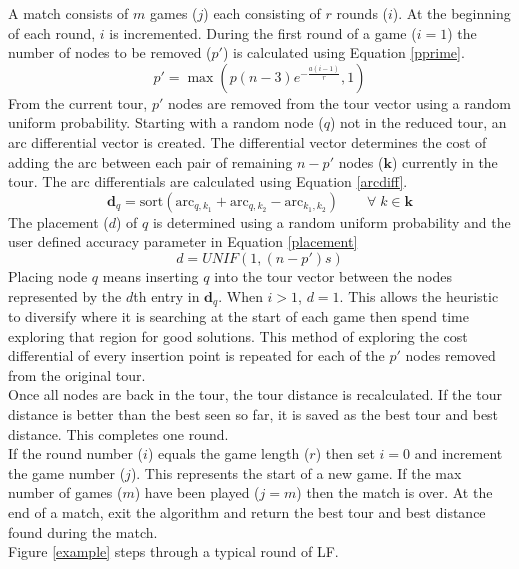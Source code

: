 \documentclass[12pt,letterpaper,oneside]{book}
\begin{document}
	A match consists of $ m $ games ($ j $) each consisting of $ r $ rounds ($ i $). At the beginning of each round, $ i $ is incremented. During the first round of a game ($ i=1 $) the number of nodes to be removed ($ p' $) is calculated using Equation \ref{pprime}.
		\begin{equation}
			p' = \max(p(n-3)e^{-\frac{a(i-1)}{r}},1)
			\label{pprime}
		\end{equation}
	From the current tour, $ p' $ nodes are removed from the tour vector using a random uniform probability. Starting with a random node ($ q $) not in the reduced tour, an arc differential vector is created. The differential vector determines the cost of adding the arc between each pair of remaining $ n-p' $ nodes ($ \boldsymbol{k} $) currently in the tour. The arc differentials are calculated using Equation \ref{arcdiff}.
		\begin{equation}
			\boldsymbol{d}_q = \text{sort}( \text{arc}_{q,k_1}+\text{arc}_{q,k_2}-\text{arc}_{k_1,k_2})\qquad\forall\;k\in \boldsymbol{k}
			\label{arcdiff}
		\end{equation}
	The placement ($ d $) of $ q $ is determined using a random uniform probability and the user defined accuracy parameter in Equation \ref{placement}
		\begin{equation}
		d = UNIF(1,(n-p')s)
		\label{placement}
		\end{equation}
	Placing node $ q $ means inserting $ q $ into the tour vector between the nodes represented by the $ d $th entry in $ \boldsymbol{d}_q $. When $ i>1 $, $ d=1 $. This allows the heuristic to diversify where it is searching at the start of each game then spend time exploring that region for good solutions. This method of exploring the cost differential of every insertion point is repeated for each of the $ p' $ nodes removed from the original tour.\\
	Once all nodes are back in the tour, the tour distance is recalculated. If the tour distance is better than the best seen so far, it is saved as the best tour and best distance. This completes one round.\\
	If the round number ($ i $) equals the game length ($ r $) then set $ i=0 $ and increment the game number ($ j $). This represents the start of a new game. If the max number of games ($ m $) have been played ($ j=m $) then the match is over. At the end of a match, exit the algorithm and return the best tour and best distance found during the match.\\
	Figure \ref{example} steps through a typical round of LF.
\end{document}
